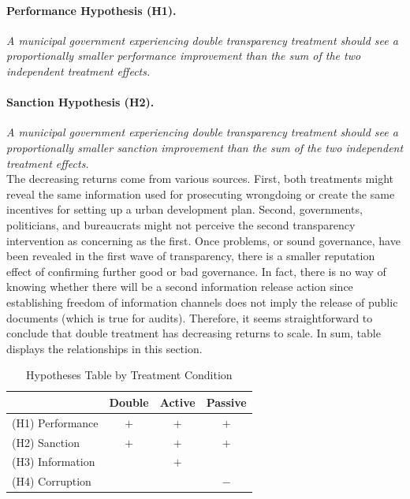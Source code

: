 \documentclass[11pt]{article}
\newcommand{\T}{\rule{0pt}{2.6ex}}            %
\newcommand{\B}{\rule[-1.2ex]{0pt}{0pt}}      %
\begin{document}
\paragraph{Performance Hypothesis (H1).} \emph{A municipal government experiencing double transparency treatment should see a proportionally smaller performance improvement than the sum of the two independent treatment effects.}

\paragraph{Sanction Hypothesis (H2).} \emph{A municipal government experiencing double transparency treatment should see a proportionally smaller sanction improvement than the sum of the two independent treatment effects.} \\

The decreasing returns come from various sources. First, both treatments might reveal the same information used for prosecuting wrongdoing or create the same incentives for setting up a urban development plan. Second, governments, politicians, and bureaucrats might not perceive the second transparency intervention as concerning as the first. Once problems, or sound governance, have been revealed in the first wave of transparency, there is a smaller reputation effect of confirming further good or bad governance. In fact, there is no way of knowing whether there will be a second information release action since establishing freedom of information channels does not imply the release of public documents (which is true for audits). Therefore, it seems straightforward to conclude that double treatment has decreasing returns to scale. In sum, table displays the relationships in this section.
\clearpage
\begin{table}[!htbp]
  \caption{Hypotheses Table by Treatment Condition}
  \label{tab:hypotheses3}
  \centering
  \scriptsize
  \begin{tabular}{l|p{1.5cm}|p{1.5cm}|p{1.5cm}}
  \hline
  \hline
                   & \multicolumn{1}{c}{Double}& \multicolumn{1}{c}{Active}& \multicolumn{1}{c}{Passive} \T \B \\
  \hline
  (H1) Performance & \multicolumn{1}{c}{$+$}   & \multicolumn{1}{c}{$+$}   & \multicolumn{1}{c}{$+$}     \T \B \\
  (H2) Sanction    & \multicolumn{1}{c}{$+$}   & \multicolumn{1}{c}{$+$}   & \multicolumn{1}{c}{$+$}     \T \B \\
  (H3) Information & \multicolumn{1}{c}{}      & \multicolumn{1}{c}{$+$}   & \multicolumn{1}{c}{}     \T \B \\
  (H4) Corruption  & \multicolumn{1}{c}{}      & \multicolumn{1}{c}{}   & \multicolumn{1}{c}{$-$}     \T \B \\
  \hline
  \hline
  \end{tabular}
\end{table}
\end{document}
